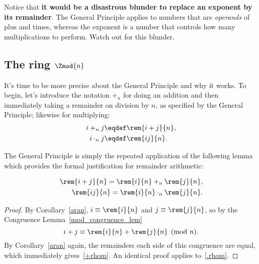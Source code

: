 Notice that \textbf{it would be a disastrous blunder to replace an
  exponent by its remainder}.  The General Principle applies to
numbers that are \emph{operands} of plus and times, whereas the
exponent is a number that controls how many multiplications to
perform.  Watch out for this blunder.

\subsection{The ring $\Zmod{n}$}

It's time to be more precise about the General Principle and why it
works.  To begin, let's introduce the notation $+_n$ for doing an
addition and then immediately taking a remainder on division by $n$,
as specified by the General Principle; likewise for multiplying:
\begin{align*}
i +_n j & \eqdef \rem{i+j}{n},\\
i \cdot_n j & \eqdef \rem{ij}{n}.
\end{align*}

The General Principle is simply the repeated application of the
following lemma which provides the formal justification for remainder
arithmetic:
\begin{lemma}\label{rem-morphism}
\begin{align}
\rem{i+j}{n} = \rem{i}{n} +_n \rem{j}{n},\label{+rhom}\\
\rem{ij}{n} = \rem{i}{n} \cdot_n \rem{j}{n}.\label{.rhom}
\end{align}
\end{lemma}

\begin{proof}
By Corollary~\ref{aran}, $i \equiv \rem{i}{n}$ and $j \equiv
\rem{j}{n}$, so by the Congruence Lemma~\ref{mod_congruence_lem}
\[
i + j \equiv \rem{i}{n} + \rem{j}{n} \pmod{n}.
\]
By Corollary~\ref{aran} again, the remainders each side of this
congruence are equal, which immediately gives~\eqref{+rhom}.  An
identical proof applies to~\eqref{.rhom}.
\end{proof}

